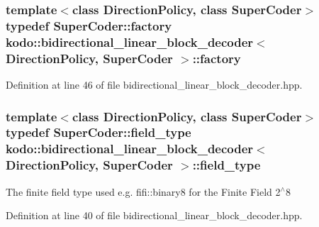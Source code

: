 \hypertarget{classkodo_1_1bidirectional__linear__block__decoder_a479515a69e06401cff0c75f51bf52126}{
\subsubsection[{factory}]{\setlength{\rightskip}{0pt plus 5cm}template$<$class Direction\-Policy, class Super\-Coder$>$ typedef Super\-Coder\-::factory {\bf kodo\-::bidirectional\-\_\-linear\-\_\-block\-\_\-decoder}$<$ Direction\-Policy, Super\-Coder $>$\-::{\bf factory}}}\label{classkodo_1_1bidirectional__linear__block__decoder_a479515a69e06401cff0c75f51bf52126}






Definition at line 46 of file bidirectional\-\_\-linear\-\_\-block\-\_\-decoder.\-hpp.

\hypertarget{classkodo_1_1bidirectional__linear__block__decoder_a5d6e9f68290031d957869f332ff2bce4}{
\subsubsection[{field\-\_\-type}]{\setlength{\rightskip}{0pt plus 5cm}template$<$class Direction\-Policy, class Super\-Coder$>$ typedef Super\-Coder\-::field\-\_\-type {\bf kodo\-::bidirectional\-\_\-linear\-\_\-block\-\_\-decoder}$<$ Direction\-Policy, Super\-Coder $>$\-::{\bf field\-\_\-type}}}\label{classkodo_1_1bidirectional__linear__block__decoder_a5d6e9f68290031d957869f332ff2bce4}




The finite field type used e.\-g. fifi\-::binary8 for the Finite Field 2$^\wedge$8 

Definition at line 40 of file bidirectional\-\_\-linear\-\_\-block\-\_\-decoder.\-hpp.

